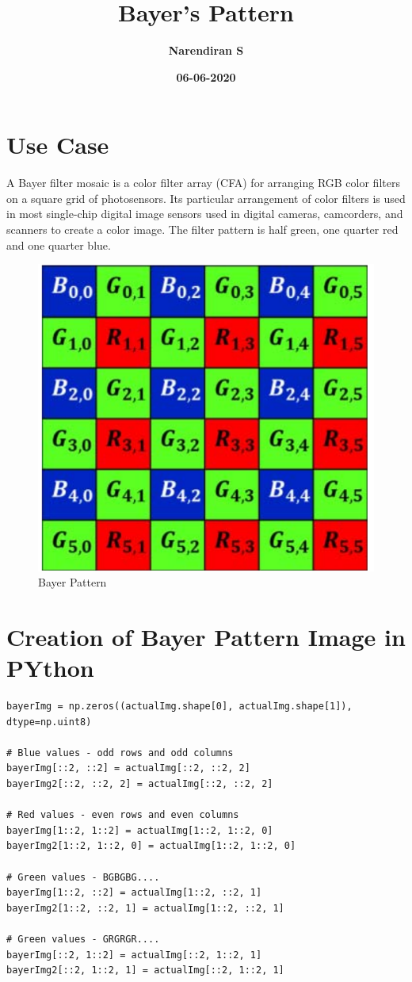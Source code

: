 \documentclass{article}
\title{\textbf{Bayer's Pattern}}
\author{\textbf{Narendiran S}}
\date{\textbf{06-06-2020}}
\begin{document}
\Large
\maketitle

\section{Use Case}

A Bayer filter mosaic is a color filter array (CFA) for arranging RGB color filters on a square grid of photosensors.
Its particular arrangement of color filters is used in most single-chip digital image sensors used in digital cameras, camcorders, and scanners to create a color image.
The filter pattern is half green, one quarter red and one quarter blue.

\begin{figure}[H]
    \centering
    \includegraphics[scale=0.3]{DocResources/BayersPattern.png}
    \caption{Bayer Pattern}
\end{figure}

\section{Creation of Bayer Pattern Image in PYthon}
\begin{verbatim}
bayerImg = np.zeros((actualImg.shape[0], actualImg.shape[1]), dtype=np.uint8)

# Blue values - odd rows and odd columns
bayerImg[::2, ::2] = actualImg[::2, ::2, 2]
bayerImg2[::2, ::2, 2] = actualImg[::2, ::2, 2]

# Red values - even rows and even columns
bayerImg[1::2, 1::2] = actualImg[1::2, 1::2, 0]
bayerImg2[1::2, 1::2, 0] = actualImg[1::2, 1::2, 0]

# Green values - BGBGBG....
bayerImg[1::2, ::2] = actualImg[1::2, ::2, 1]
bayerImg2[1::2, ::2, 1] = actualImg[1::2, ::2, 1]

# Green values - GRGRGR....
bayerImg[::2, 1::2] = actualImg[::2, 1::2, 1]
bayerImg2[::2, 1::2, 1] = actualImg[::2, 1::2, 1]
\end{verbatim}
\end{document}
